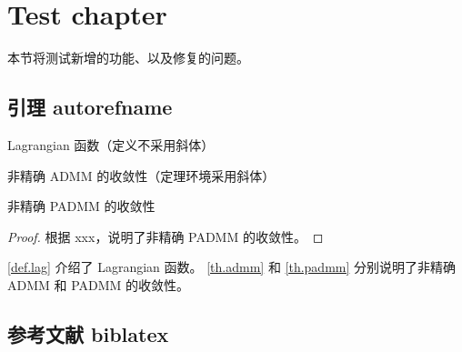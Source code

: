 \chapter{Test chapter}
本节将测试新增的功能、以及修复的问题。

\section{引理 autorefname}

\begin{definition}[Lagrangian]\label{def.lag}
    Lagrangian 函数（定义不采用斜体）
\end{definition}

\begin{theorem}[ADMM]\label{th.admm}
    非精确 ADMM 的收敛性（定理环境采用斜体）
\end{theorem}

\begin{lemma}[PADMM]\label{th.padmm}
    非精确 PADMM 的收敛性
\end{lemma}

\begin{proof}
    根据 xxx，说明了非精确 PADMM 的收敛性。
\end{proof}

\autoref{def.lag} 介绍了 Lagrangian 函数。
\autoref{th.admm} 和 \autoref{th.padmm} 分别说明了非精确 ADMM 和 PADMM 的收敛性。


\section{参考文献 biblatex}

